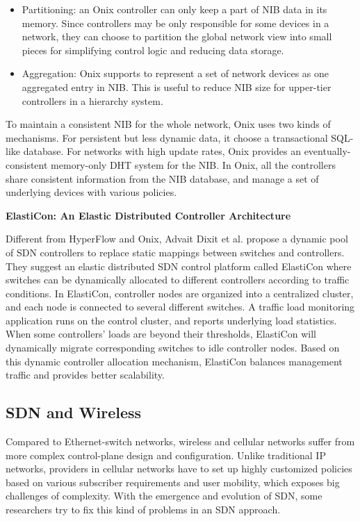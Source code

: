 \documentclass[english]{tktltiki}
\begin{document}
\begin{itemize}
  \item Partitioning: an Onix controller can only keep a part of NIB data in its memory. Since controllers may be only responsible for some devices in a network, they can choose to partition the global network view into small pieces for simplifying control logic and reducing data storage.
  \item Aggregation: Onix supports to represent a set of network devices as one aggregated entry in NIB. This is useful to reduce NIB size for upper-tier controllers in a hierarchy system.
\end{itemize}

To maintain a consistent NIB for the whole network, Onix uses two kinds of mechanisms. For persistent but less dynamic data, it choose a transactional SQL-like database. For networks with high update rates, Onix provides an eventually-consistent memory-only DHT system for the NIB. In Onix, all the controllers share consistent information from the NIB database, and manage a set of underlying devices with various policies.

\vspace{1mm}

\textbf{ElastiCon: An Elastic Distributed Controller Architecture}

\vspace{1mm}

Different from HyperFlow and Onix, Advait Dixit et al. \cite{dhm+13} propose a dynamic pool of SDN controllers to replace static mappings between switches and controllers. They suggest an elastic distributed SDN control platform called ElastiCon where switches can be dynamically allocated to different controllers according to traffic conditions. In ElastiCon, controller nodes are organized into a centralized cluster, and each node is connected to several different switches. A traffic load monitoring application runs on the control cluster, and reports underlying load statistics. When some controllers' loads are beyond their thresholds, ElastiCon will dynamically migrate corresponding switches to idle controller nodes. Based on this dynamic controller allocation mechanism, ElastiCon balances management traffic and provides better scalability.


\subsection{SDN and Wireless}

Compared to Ethernet-switch networks, wireless and cellular networks suffer from more complex control-plane design and configuration. Unlike traditional IP networks, providers in cellular networks have to set up highly customized policies based on various subscriber requirements and user mobility, which exposes big challenges of complexity. With the emergence and evolution of SDN, some researchers try to fix this kind of problems in an SDN approach. 
\end{document}
